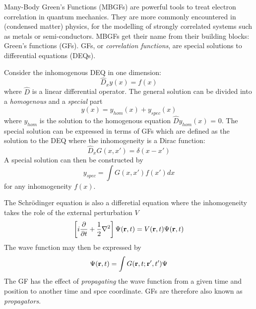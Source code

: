 Many-Body Green's Functions (MBGFs) are powerful tools to treat electron correlation in quantum mechanics. They are more commonly encountered in (condensed matter) physics, for the modelling of strongly correlated systems such as metals or semi-conductors. MBGFs get their name from their building blocks: Green's functions (GFs). GFs, or \emph{correlation functions}, are special solutions to differential equations (DEQs).

Consider the inhomogenous DEQ in one dimension:
\begin{equation}
\hat{D}_x y(x) = f(x)
\end{equation}
\noindent where $\hat{D}$ is a linear differential operator. The general solution can be divided into a \emph{homogenous} and a \emph{special} part
\begin{equation}
y(x) = y_{hom}(x) + y_{spec}(x)
\end{equation}
\noindent where $y_{hom}$ is the solution to the homogenous equation $\hat{D}y_{hom}(x)$ = 0. The special solution can be expressed in terms of GFs which are defined as the solution to the DEQ where the inhomogeneity is a Dirac function:
\begin{equation}
\hat{D}_x G(x,x') = \delta(x-x')
\end{equation}
\noindent A special solution can then be constructed by
\begin{equation}
y_{spec} = \int G(x,x')f(x') dx
\end{equation}
\noindent for any inhomogeneity $f(x)$. 

The Schrödinger equation is also a differetial equation where the inhomogeneity takes the role of the external perturbation $V$
\begin{equation}
\left[ i\frac{\partial}{\partial t} + \frac{1}{2} \nabla^2 \right] \Psi(\mathbf{r},t) = V(\mathbf{r},t) \Psi(\mathbf{r},t)
\end{equation}
\noindent The wave function may then be expressed by
\begin{equation}
\Psi(\mathbf{r},t) = \int G(\mathbf{r},t;\mathbf{r}',t') \Psi
\end{equation}
\noindent The GF has the effect of \emph{propagating} the wave function from a given time and position to another time and spce coordinate. GFs are therefore also known as \emph{propagators}.

